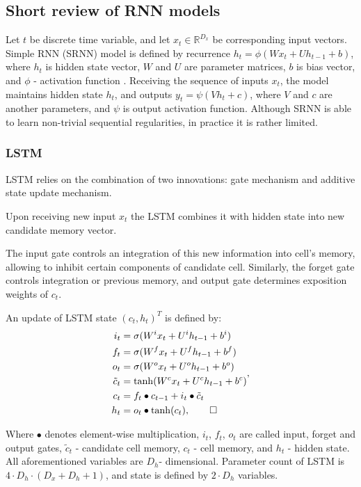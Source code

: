 \documentclass[a4paper,11pt]{article}
\begin{document}
\subsection{Short review of RNN models}
Let $t$ be discrete time variable, and let $x_{t} \in \mathbb{R}^{D_{x}}$ be corresponding input vectors. Simple RNN (SRNN) model is defined by 
recurrence $h_{t} = \phi(Wx_{t} + Uh_{t-1} + b)$, where $h_{t}$ is hidden state vector, 
$W$ and $U$ are parameter matrices, $b$ is bias vector, and $\phi$ - activation function \cite{Elman}. 
Receiving the sequence of inputs $x_{t}$, the model maintains hidden state $h_{t}$, and 
outputs $y_{t} = \psi(Vh_{t} + c)$, where $V$ and $c$ are another parameters, and $\psi$ is output activation function. Although SRNN is able to learn non-trivial sequential regularities, in practice it is rather limited. 


\subsubsection{LSTM}


LSTM \cite{Hochreiter} relies on the combination of two innovations: gate mechanism and additive state update mechanism.

Upon receiving new input $x_{t}$ the LSTM combines it with hidden state into new candidate memory vector.

The input gate controls an integration of this new information into cell's memory, allowing to 
inhibit certain components of candidate cell. Similarly, the forget gate controls integration or previous memory, 
and output gate determines exposition weights of $c_{t}$.

An update of LSTM state $(c_{t}, h_{t})^{T}$ is defined by:
\begin{align}
\begin{split}
\label{LSTM}
i_{t} &=\sigma(W^{i}x_{t} + U^{i}h_{t-1} + b^{i})\\
f_{t} &=\sigma(W^{f}x_{t} + U^{f}h_{t-1} + b^{f})\\
o_{t} &=\sigma(W^{o}x_{t} + U^{o}h_{t-1} + b^{o})\\
\tilde{c}_{t} &= \tanh(W^{c}x_{t} + U^{c}h_{t-1} + b^{c})\\
c_{t} &=f_{t} \bullet c_{t-1} + i_{t} \bullet \tilde{c}_{t}\\
h_{t} &=o_{t} \bullet \tanh(c_{t}), \qedhere
\end{split},
\end{align}

Where $\bullet$ denotes element-wise multiplication, $i_{t}$, $f_{t}$, $o_{t}$ are called input, forget and 
output gates, $\tilde{c}_{t}$ - candidate cell memory, $c_{t}$ - cell memory, and $h_{t}$ - hidden state. 
All aforementioned variables are $D_{h}$- dimensional. Parameter count of LSTM is 
$4 \cdot D_{h} \cdot (D_{x}  + D_{h} + 1)$, and state is defined by $2 \cdot D_{h}$ variables.
\end{document}
